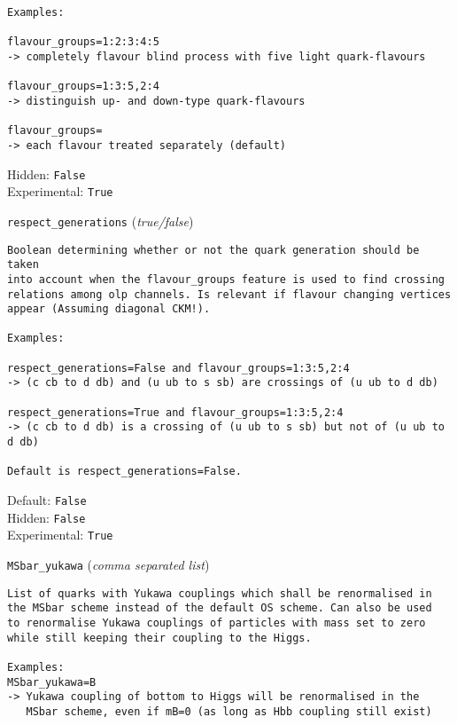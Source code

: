 \begin{basedescript}{\desclabelstyle{\pushlabel}}
\begin{verbatim}
Examples:

flavour_groups=1:2:3:4:5
-> completely flavour blind process with five light quark-flavours

flavour_groups=1:3:5,2:4
-> distinguish up- and down-type quark-flavours

flavour_groups=
-> each flavour treated separately (default)
\end{verbatim}
Hidden: \verb|False|
\\Experimental: \verb|True|
\\\item[\colorbox{gray!30}{\texttt{respect\_generations}}] (\textit{true/false})
\begin{verbatim}
Boolean determining whether or not the quark generation should be taken
into account when the flavour_groups feature is used to find crossing
relations among olp channels. Is relevant if flavour changing vertices
appear (Assuming diagonal CKM!).

Examples:

respect_generations=False and flavour_groups=1:3:5,2:4
-> (c cb to d db) and (u ub to s sb) are crossings of (u ub to d db)

respect_generations=True and flavour_groups=1:3:5,2:4
-> (c cb to d db) is a crossing of (u ub to s sb) but not of (u ub to d db)

Default is respect_generations=False.
\end{verbatim}
Default: \verb|False|
\\Hidden: \verb|False|
\\Experimental: \verb|True|
\\\item[\colorbox{gray!30}{\texttt{MSbar\_yukawa}}] (\textit{comma separated list})
\begin{verbatim}
List of quarks with Yukawa couplings which shall be renormalised in
the MSbar scheme instead of the default OS scheme. Can also be used
to renormalise Yukawa couplings of particles with mass set to zero
while still keeping their coupling to the Higgs.

Examples:
MSbar_yukawa=B
-> Yukawa coupling of bottom to Higgs will be renormalised in the
   MSbar scheme, even if mB=0 (as long as Hbb coupling still exist)


\end{verbatim}
\end{basedescript}
